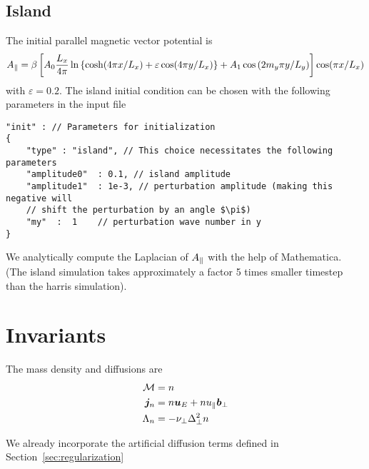 \subsection{Island}
The initial parallel magnetic vector potential is
\begin{align}
    A_\parallel =\beta \left[ A_0\frac{L_x}{4\pi} \ln \left\{ \cosh( 4\pi x/L_x) + \varepsilon \cos( 4\pi y/L_x)\right\} + A_1\cos{(2m_y \pi y/L_y)}\right] \cos( \pi x /L_x)
\end{align}
with $\varepsilon = 0.2$.
The island initial condition can be chosen with the following parameters in the input file
\begin{verbatim}
"init" : // Parameters for initialization
{
    "type" : "island", // This choice necessitates the following parameters
    "amplitude0"  : 0.1, // island amplitude
    "amplitude1"  : 1e-3, // perturbation amplitude (making this negative will
    // shift the perturbation by an angle $\pi$)
    "my"  :  1    // perturbation wave number in y
}
\end{verbatim}
We analytically compute the Laplacian of $A_\parallel$ with the help of Mathematica.
(The island simulation takes approximately a factor 5 times smaller timestep than
the harris simulation).

\section{Invariants}
The mass density and diffusions are
\begin{align}
    \mathcal M &= n  \\
    {\boldsymbol{j}}_n &= n  {\boldsymbol{u}}_E + n u_\parallel {\boldsymbol{b}}_\perp \\
     \Lambda_n &= -\nu_\perp \Delta_\perp^2 n 
\end{align}
\begin{tcolorbox}[title=Note]
    We already incorporate the artificial diffusion terms defined in
    Section~\ref{sec:regularization}
\end{tcolorbox}

